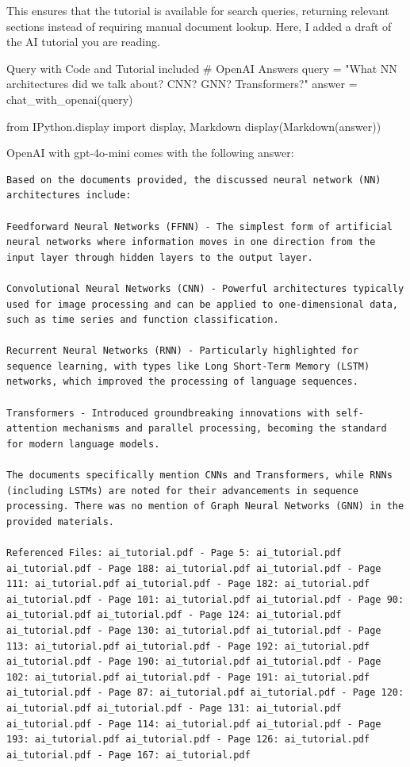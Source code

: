 This ensures that the tutorial is available for search queries, returning relevant sections instead of 
requiring manual document lookup. Here, I added a draft of the AI tutorial you are reading. 

\begin{codeonly}{Query with Code and Tutorial included}
# OpenAI Answers
query = "What NN architectures did we talk about? CNN? GNN? Transformers?"
answer = chat_with_openai(query)

from IPython.display import display, Markdown
display(Markdown(answer))
\end{codeonly}

OpenAI with gpt-4o-mini comes with the following answer: 

\lstset{language=}
\begin{lstlisting}
Based on the documents provided, the discussed neural network (NN) architectures include:

Feedforward Neural Networks (FFNN) - The simplest form of artificial neural networks where information moves in one direction from the input layer through hidden layers to the output layer.

Convolutional Neural Networks (CNN) - Powerful architectures typically used for image processing and can be applied to one-dimensional data, such as time series and function classification.

Recurrent Neural Networks (RNN) - Particularly highlighted for sequence learning, with types like Long Short-Term Memory (LSTM) networks, which improved the processing of language sequences.

Transformers - Introduced groundbreaking innovations with self-attention mechanisms and parallel processing, becoming the standard for modern language models.

The documents specifically mention CNNs and Transformers, while RNNs (including LSTMs) are noted for their advancements in sequence processing. There was no mention of Graph Neural Networks (GNN) in the provided materials.

Referenced Files: ai_tutorial.pdf - Page 5: ai_tutorial.pdf ai_tutorial.pdf - Page 188: ai_tutorial.pdf ai_tutorial.pdf - Page 111: ai_tutorial.pdf ai_tutorial.pdf - Page 182: ai_tutorial.pdf ai_tutorial.pdf - Page 101: ai_tutorial.pdf ai_tutorial.pdf - Page 90: ai_tutorial.pdf ai_tutorial.pdf - Page 124: ai_tutorial.pdf ai_tutorial.pdf - Page 130: ai_tutorial.pdf ai_tutorial.pdf - Page 113: ai_tutorial.pdf ai_tutorial.pdf - Page 192: ai_tutorial.pdf ai_tutorial.pdf - Page 190: ai_tutorial.pdf ai_tutorial.pdf - Page 102: ai_tutorial.pdf ai_tutorial.pdf - Page 191: ai_tutorial.pdf ai_tutorial.pdf - Page 87: ai_tutorial.pdf ai_tutorial.pdf - Page 120: ai_tutorial.pdf ai_tutorial.pdf - Page 131: ai_tutorial.pdf ai_tutorial.pdf - Page 114: ai_tutorial.pdf ai_tutorial.pdf - Page 193: ai_tutorial.pdf ai_tutorial.pdf - Page 126: ai_tutorial.pdf ai_tutorial.pdf - Page 167: ai_tutorial.pdf
\end{lstlisting}

